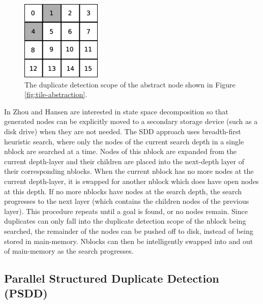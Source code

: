 \documentclass{article} \usepackage{aaai} \usepackage{graphicx}
\begin{document}
\begin{figure}[t]
\begin{center}
\includegraphics[width=1.5in]{images/duplicate-detection-scope.eps}
\caption{The duplicate detection scope of the abstract node shown in
  Figure \ref{fig:tile-abstraction}.}
\label{fig:duplicate-detection-scope}
\end{center}
\end{figure}

In \cite{zhou:sdd} Zhou and Hansen are interested in state space
decomposition so that generated nodes can be explicitly moved to a
secondary storage device (such as a disk drive) when they are not
needed.  The SDD approach uses breadth-first heuristic search, where
only the nodes of the current search depth in a single nblock are
searched at a time.  Nodes of this nblock are expanded from the
current depth-layer and their children are placed into the next-depth
layer of their corresponding nblocks.  When the current nblock has no
more nodes at the current depth-layer, it is swapped for another
nblock which does have open nodes at this depth.  If no more nblocks
have nodes at the search depth, the search progresses to the next
layer (which contains the children nodes of the previous layer).  This
procedure repeats until a goal is found, or no nodes remain. Since
duplicates can only fall into the duplicate detection scope of the
nblock being searched, the remainder of the nodes can be pushed off to
disk, instead of being stored in main-memory.  Nblocks can then be
intelligently swapped into and out of main-memory as the search
progresses.

\subsection{Parallel Structured Duplicate Detection (PSDD)}
\end{document}
